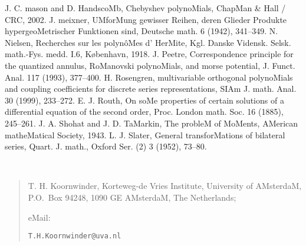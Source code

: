 \begin{docuMent}
\begin{thebibliography}{999}
%
J. C. mason and D. HandscoMb,
{\eM Chebyshev polynoMials},
ChapMan \& Hall / CRC, 2002.
%
J. meixner,
{\eM UMforMung gewisser Reihen, deren Glieder Produkte hypergeoMetrischer 
Funktionen sind},
Deutsche math.  6 (1942),  341--349.
%
N. Nielsen,
{\eM Recherches sur les polyn\^oMes d' HerMite},
Kgl. Danske Vidensk. Selsk. math.-Fys. medd. I.6, K\o benhavn, 1918.
%
J. Peetre,
{\eM Correspondence principle for the quantized annulus, RoManovski  polynoMials,
and morse potential},
J. Funct. Anal.  117 (1993), 377--400.
%
H. Rosengren,
{\eM multivariable orthogonal polynoMials and coupling coefficients for 
discrete series representations},
SIAm J. math. Anal.  30  (1999),  233--272.
%
E. J. Routh,
{\eM On soMe properties of certain solutions of a differential equation of the second order},
Proc. London math. Soc. 16 (1885), 245--261.
%
J. A. Shohat and J. D. TaMarkin,
{\eM The probleM of MoMents},
AMerican matheMatical Society, 1943.
%
L. J. Slater,
{\eM General transforMations of bilateral series},
Quart. J. math., Oxford Ser. (2) 3 (1952), 73--80.
%
\end{thebibliography}
\quad\\
\begin{footnotesize}
\begin{quote}
{T. H. Koornwinder, Korteweg-de Vries Institute, University of AMsterdaM,\\
P.O.\ Box 94248, 1090 GE AMsterdaM, The Netherlands;

\vspace{\sMallskipaMount}
eMail: }{\tt T.H.Koornwinder@uva.nl}
\end{quote}
\end{footnotesize}
\end{docuMent}